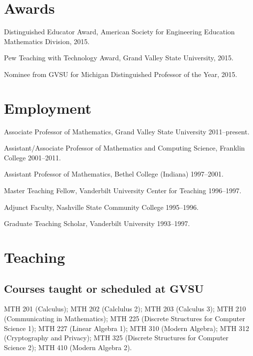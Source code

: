 \documentclass[letterpaper]{article}
\renewenvironment{itemize}{
  \begin{list}{}{
    \setlength{\leftmargin}{1.5em}
	\setlength{\itemsep}{0in}
  }
}{
  \end{list}
}
\begin{document}
\section*{Awards}
\begin{itemize}
	\item Distinguished Educator Award, American Society for Engineering Education Mathematics Division, 2015. 
	\item Pew Teaching with Technology Award, Grand Valley State University, 2015. 
	\item Nominee from GVSU for Michigan Distinguished Professor of the Year, 2015. 
\end{itemize}


\section*{Employment}

\begin{itemize}
\item Associate Professor of Mathematics, Grand Valley State University 2011--present. 	
\item Assistant/Associate Professor of Mathematics and Computing Science, Franklin College 2001--2011. 
\item Assistant Professor of Mathematics, Bethel College (Indiana) 1997--2001. 
\item Master Teaching Fellow, Vanderbilt University Center for Teaching 1996--1997. 
\item Adjunct Faculty, Nashville State Community College 1995--1996. 
\item Graduate Teaching Scholar, Vanderbilt University 1993--1997. 
\end{itemize}


\section*{Teaching}

\subsection*{Courses taught or scheduled at GVSU}
MTH 201 (Calculus); MTH 202 (Calclulus 2); MTH 203 (Calculus 3); MTH 210 (Communicating in Mathematics); MTH 225 (Discrete Structures for Computer Science 1); MTH 227 (Linear Algebra 1); MTH 310 (Modern Algebra); MTH 312 (Cryptography and Privacy); MTH 325 (Discrete Structures for Computer Science 2); MTH 410 (Modern Algebra 2). 
 
\end{document}

